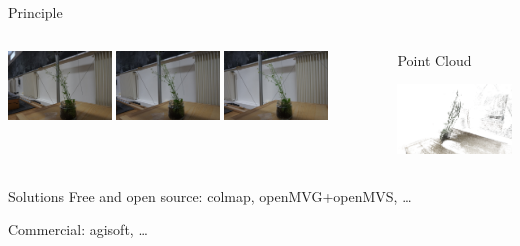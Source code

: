 \documentclass{beamer}
\begin{document}
\begin{frame}{Principle}
\begin{columns}
\begin{column}{0.45\textwidth}
            \includegraphics[width=0.3\textwidth]{images/rgb006.jpg}
            \includegraphics[width=0.3\textwidth]{images/rgb007.jpg}
            \includegraphics[width=0.3\textwidth]{images/rgb008.jpg}
        \end{column}
        \begin{column}{0.1\textwidth}
$\Rightarrow$
        \end{column}
        \begin{column}{0.45\textwidth}
            \centering
            Point Cloud

             \includegraphics[width=\textwidth]{images/pointcloud.png}
        \end{column}
    \end{columns}
        \vspace{2em}
    \begin{block}{Solutions}
        Free and open source: colmap, openMVG+openMVS, \dots

        Commercial: agisoft, \dots

    \end{block}
\end{frame}
\end{document}
